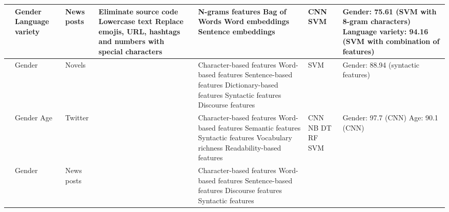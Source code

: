 \begin{longtable}{ p{} p{} p{} p{} p{} p{} p{}}
\hline
\cite{gomez2019convolutional} 
& Gender
\newline Language variety
& News posts
& Eliminate source code
\newline Lowercase text
\newline Replace emojis, URL, hashtags and numbers with special characters
& N-grams features
\newline Bag of Words
\newline Word embeddings
\newline Sentence embeddings
& \acrshort{CNN}
\newline \acrshort{SVM}
& Gender: 75.61 (SVM with 8-gram characters)
\newline Language variety: 94.16 (SVM with combination of features)
\\
\hline
\cite{wanner2017relevance} 
& Gender
& Novels
& 
& Character-based features
\newline Word-based features
\newline Sentence-based features
\newline Dictionary-based features
\newline Syntactic features
\newline Discourse features
& \acrshort{SVM}
& Gender: 88.94 (syntactic features)
\\
\hline
\cite{surendran2017stylometry} 
& Gender
\newline Age
& Twitter
& 
& Character-based features
\newline Word-based features
\newline Semantic features
\newline Syntactic features
\newline Vocabulary richness
\newline Readability-based features
& \acrshort{CNN}
\newline \acrshort{NB}
\newline \acrshort{DT}
\newline \acrshort{RF}
\newline \acrshort{SVM}
& Gender: 97.7 (CNN)
\newline Age: 90.1 (CNN)
\\
\hline
\cite{pearce2016use} 
& Gender
& News posts
& 
& Character-based features
\newline Word-based features
\newline Sentence-based features
\newline Discourse features
\newline Syntactic features

\end{longtable}
